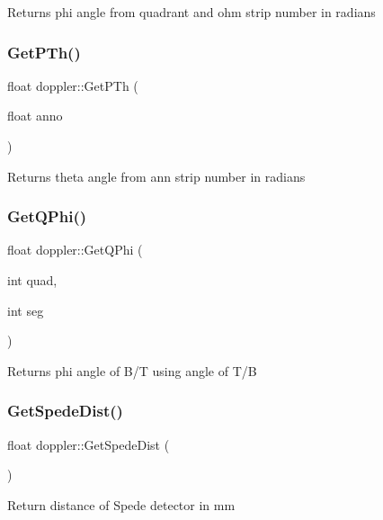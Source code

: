 Returns phi angle from quadrant and ohm strip number in radians \mbox{\label{classdoppler_a1415bdb47dbb9d5eba7f14a64bd3693e}} 
\subsubsection{\texorpdfstring{Get\+P\+Th()}{GetPTh()}}
{\footnotesize\ttfamily float doppler\+::\+Get\+P\+Th (\begin{DoxyParamCaption}\item[{float}]{anno }\end{DoxyParamCaption})}

Returns theta angle from ann strip number in radians \mbox{\label{classdoppler_a7c3afd05ed9ddb8c5bedc0de905acd0b}} 
\subsubsection{\texorpdfstring{Get\+Q\+Phi()}{GetQPhi()}}
{\footnotesize\ttfamily float doppler\+::\+Get\+Q\+Phi (\begin{DoxyParamCaption}\item[{int}]{quad,  }\item[{int}]{seg }\end{DoxyParamCaption})}

Returns phi angle of B/T using angle of T/B \mbox{\label{classdoppler_ae45abdba9f375009cdeba5ac81d7b32c}} 
\subsubsection{\texorpdfstring{Get\+Spede\+Dist()}{GetSpedeDist()}}
{\footnotesize\ttfamily float doppler\+::\+Get\+Spede\+Dist (\begin{DoxyParamCaption}{ }\end{DoxyParamCaption})}

Return distance of Spede detector in mm \mbox{\label{classdoppler_a31a09afe8920dc1302162ec8e0be9302}} 
